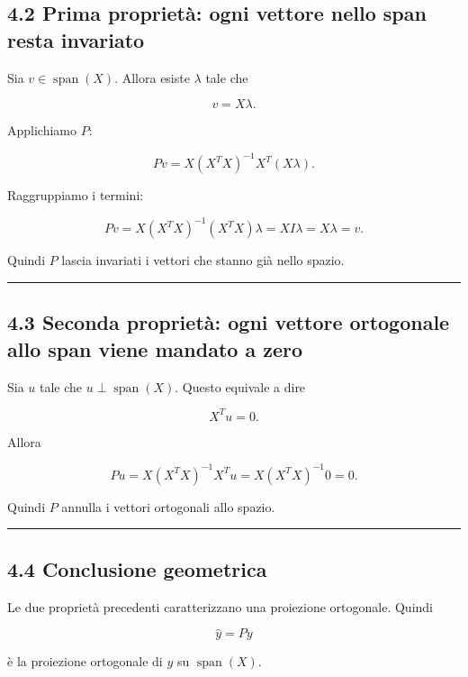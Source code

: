 \documentclass{article}
\begin{document}
\subsection{4.2 Prima proprietà: ogni vettore nello span resta
invariato}\label{prima-proprietuxe0-ogni-vettore-nello-span-resta-invariato}

Sia \(v\in\operatorname{span}(X)\). Allora esiste \(\lambda\) tale che

\[
v=X\lambda.
\]

Applichiamo \(P\):

\[
Pv = X(X^TX)^{-1}X^T(X\lambda).
\]

Raggruppiamo i termini:

\[
Pv = X(X^TX)^{-1}(X^TX)\lambda = XI\lambda = X\lambda = v.
\]

Quindi \(P\) lascia invariati i vettori che stanno già nello spazio.

\begin{center}\rule{0.5\linewidth}{0.5pt}\end{center}

\subsection{4.3 Seconda proprietà: ogni vettore ortogonale allo span
viene mandato a
zero}\label{seconda-proprietuxe0-ogni-vettore-ortogonale-allo-span-viene-mandato-a-zero}

Sia \(u\) tale che \(u\perp \operatorname{span}(X)\). Questo equivale a
dire

\[
X^Tu=0.
\]

Allora

\[
Pu = X(X^TX)^{-1}X^Tu = X(X^TX)^{-1}0 = 0.
\]

Quindi \(P\) annulla i vettori ortogonali allo spazio.

\begin{center}\rule{0.5\linewidth}{0.5pt}\end{center}

\subsection{4.4 Conclusione geometrica}\label{conclusione-geometrica}

Le due proprietà precedenti caratterizzano una proiezione ortogonale.
Quindi

\[
\hat y = Py
\]

è la proiezione ortogonale di \(y\) su \(\operatorname{span}(X)\).
\end{document}
